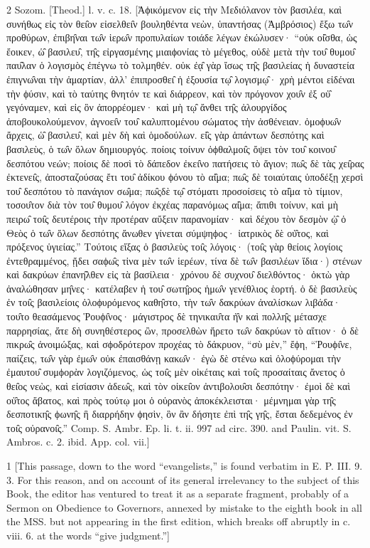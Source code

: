 2
Sozom. [Theod.] l. v. c. 18. [Ἀϕικόμενον εἰς τὴν Μεδιόλανον τὸν βασιλέα, καὶ συνήθως εἰς τὸν θει̑ον εἰσελθει̑ν βουληθέντα νεὼν, ὑπαντήσας (Ἀμβρόσιος) ἔξω τω̑ν προθύρων, ἐπιβη̑ναι τω̑ν ἱερω̑ν προπυλαίων τοιάδε λέγων ἐκώλυσεν· “οὐκ οἰ̑σθα, ὡς ἔοικεν, ὡ̑ βασιλευ̑, τη̑ς εἰργασμένης μιαιϕονίας τὸ μέγεθος, οὐδὲ μετὰ τὴν του̑ θυμου̑ παυ̑λαν ὁ λογισμὸς ἐπέγνω τὸ τολμηθέν. οὐκ ἐᾳ̑ γὰρ ἴσως τη̑ς βασιλείας ἡ δυναστεία ἐπιγνω̑ναι τὴν ἁμαρτίαν, ἀλλ’ ἐπιπροσθει̑ ἡ ἐξουσία τῳ̑ λογισμῳ̑· χρὴ μέντοι εἰδέναι τὴν ϕύσιν, καὶ τὸ ταύτης θνητόν τε καὶ διάρρεον, καὶ τὸν πρόγονον χου̑ν ἐξ οὑ̑ γεγόναμεν, καὶ εἰς ὃν ἀπορρέομεν· καὶ μὴ τῳ̑ ἄνθει τη̑ς ἀλουργίδος ἀποβουκολούμενον, ἀγνοει̑ν του̑ καλυπτομένου σώματος τὴν ἀσθένειαν. ὁμοϕυω̑ν ἄρχεις, ὡ̑ βασιλευ̑, καὶ μὲν δὴ καὶ ὁμοδούλων. εἱ̑ς γὰρ ἁπάντων δεσπότης καὶ βασιλεὺς, ὁ τω̑ν ὅλων δημιουργός. ποίοις τοίνυν ὀϕθαλμοι̑ς ὄψει τὸν του̑ κοινου̑ δεσπότου νεών; ποίοις δὲ ποσὶ τὸ δάπεδον ἐκει̑νο πατήσεις τὸ ἅγιον; πω̑ς δὲ τὰς χει̑ρας ἐκτενει̑ς, ἀποσταζούσας ἔτι του̑ ἀδίκου ϕόνου τὸ αἱ̑μα; πω̑ς δὲ τοιαύταις ὑποδέξῃ χερσὶ του̑ δεσπότου τὸ πανάγιον σω̑μα; πω̑ςδὲ τῳ̑ στόματι προσοίσεις τὸ αἱ̑μα τὸ τίμιον, τοσου̑τον διὰ τὸν του̑ θυμου̑ λόγον ἐκχέας παρανόμως αἱ̑μα; ἄπιθι τοίνυν, καὶ μὴ πειρω̑ τοι̑ς δευτέροις τὴν προτέραν αὔξειν παρανομίαν· καὶ δέχου τὸν δεσμὸν ᾠ̑ ὁ Θεὸς ὁ τω̑ν ὅλων δεσπότης ἄνωθεν γίνεται σύμψηϕος· ἰατρικὸς δὲ οὑ̑τος, καὶ πρόξενος ὑγιείας.” Τούτοις εἴξας ὁ βασιλεὺς τοι̑ς λόγοις· (τοι̑ς γὰρ θείοις λογίοις ἐντεθραμμένος, ᾔδει σαϕω̑ς τἰνα μὲν τω̑ν ἱερέων, τίνα δὲ τω̑ν βασιλέων ἴδια·) στένων καὶ δακρύων ἐπανη̑λθεν εἰς τὰ βασίλεια· χρόνου δὲ συχνου̑ διελθόντος· ὀκτὼ γὰρ ἀναλώθησαν μη̑νες· κατέλαβεν ἡ του̑ σωτη̑ρος ἡμω̑ν γενέθλιος ἑορτή. ὁ δὲ βασιλεὺς ἐν τοι̑ς βασιλείοις ὀλοϕυρόμενος καθη̑στο, τὴν τω̑ν δακρύων ἀναλίσκων λιβάδα· του̑το θεασάμενος Ῥουϕι̑νος· μάγιστρος δὲ τηνικαυ̑τα ἠ̑ν καὶ πολλη̑ς μέτασχε παρρησίας, ἅτε δὴ συνηθέστερος ὢν, προσελθὼν ἤρετο τω̑ν δακρύων τὸ αἴτιον· ὁ δὲ πικρω̑ς ἀνοιμώξας, καὶ σϕοδρότερον προχέας τὸ δάκρυον, “σὺ μὲν,” ἔϕη, “Ῥουϕι̑νε, παίζεις, τω̑ν γὰρ ἐμω̑ν οὐκ ἐπαισθάνῃ κακω̑ν· ἐγὼ δὲ στένω καὶ ὀλοϕύρομαι τὴν ἐμαυτου̑ συμϕορὰν λογιζόμενος, ὡς τοι̑ς μὲν οἰκέταις καὶ τοι̑ς προσαίταις ἄνετος ὁ θει̑ος νεὼς, καὶ εἰσίασιν ἀδεω̑ς, καὶ τὸν οἰκει̑ον ἀντιβολου̑σι δεσπότην· ἐμοὶ δὲ καὶ οὑ̑τος ἄβατος, καὶ πρὸς τούτῳ μοι ὁ οὐρανὸς ἀποκέκλεισται· μέμνημαι γὰρ τη̑ς δεσποτικη̑ς ϕωνη̑ς ἣ διαρρήδην ϕησὶν, ὃν ἂν δήσητε ἐπὶ τη̑ς γη̑ς, ἔσται δεδεμένος ἐν τοι̑ς οὐρανοι̑ς.” Comp. S. Ambr. Ep. li. t. ii. 997 ad circ. 390. and Paulin. vit. S. Ambros. c. 2. ibid. App. col. vii.]

1
[This passage, down to the word “evangelists,” is found verbatim in E. P. III. 9. 3. For this reason, and on account of its general irrelevancy to the subject of this Book, the editor has ventured to treat it as a separate fragment, probably of a Sermon on Obedience to Governors, annexed by mistake to the eighth book in all the MSS. but not appearing in the first edition, which breaks off abruptly in c. viii. 6. at the words “give judgment.”]

